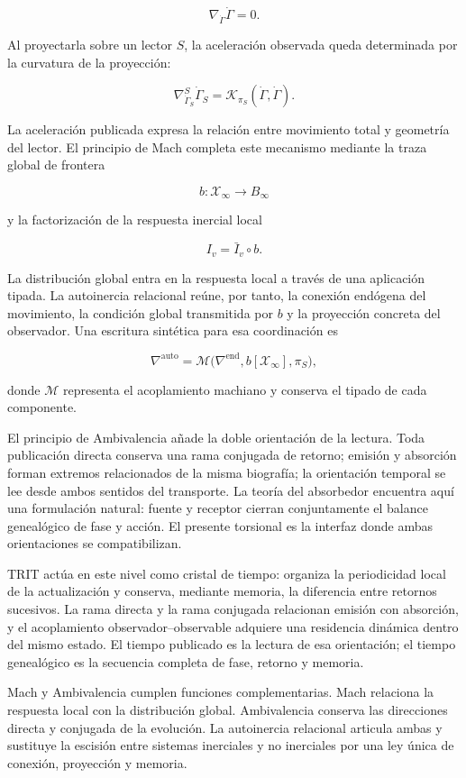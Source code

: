 \[
\nabla_{\dot\Gamma}\dot\Gamma=0.
\]

Al proyectarla sobre un lector \(S\), la aceleración observada queda determinada por la curvatura de la proyección:

\[
\nabla^S_{\dot\Gamma_S}\dot\Gamma_S
=
\mathcal K_{\pi_S}(\dot\Gamma,\dot\Gamma).
\]

La aceleración publicada expresa la relación entre movimiento total y geometría del lector. El principio de Mach completa este mecanismo mediante la traza global de frontera

\[
b:\mathcal X_\infty\longrightarrow B_\infty
\]

y la factorización de la respuesta inercial local

\[
I_v=\bar I_v\circ b.
\]

La distribución global entra en la respuesta local a través de una aplicación tipada. La autoinercia relacional reúne, por tanto, la conexión endógena del movimiento, la condición global transmitida por \(b\) y la proyección concreta del observador. Una escritura sintética para esa coordinación es

\[
\nabla^{\mathrm{auto}}
=
\mathcal M\bigl(
\nabla^{\mathrm{end}},
b[\mathcal X_\infty],
\pi_S
\bigr),
\]

donde \(\mathcal M\) representa el acoplamiento machiano y conserva el tipado de cada componente.

El principio de Ambivalencia añade la doble orientación de la lectura. Toda publicación directa conserva una rama conjugada de retorno; emisión y absorción forman extremos relacionados de la misma biografía; la orientación temporal se lee desde ambos sentidos del transporte. La teoría del absorbedor encuentra aquí una formulación natural: fuente y receptor cierran conjuntamente el balance genealógico de fase y acción. El presente torsional es la interfaz donde ambas orientaciones se compatibilizan.

TRIT actúa en este nivel como cristal de tiempo: organiza la periodicidad local de la actualización y conserva, mediante memoria, la diferencia entre retornos sucesivos. La rama directa y la rama conjugada relacionan emisión con absorción, y el acoplamiento observador–observable adquiere una residencia dinámica dentro del mismo estado. El tiempo publicado es la lectura de esa orientación; el tiempo genealógico es la secuencia completa de fase, retorno y memoria.

Mach y Ambivalencia cumplen funciones complementarias. Mach relaciona la respuesta local con la distribución global. Ambivalencia conserva las direcciones directa y conjugada de la evolución. La autoinercia relacional articula ambas y sustituye la escisión entre sistemas inerciales y no inerciales por una ley única de conexión, proyección y memoria.

